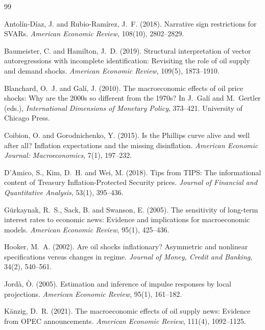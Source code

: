 \documentclass[11pt,a4paper]{article}
\begin{document}
\begin{thebibliography}{99}
\setlength{\itemsep}{0.15em}\small

Antol\'{i}n-D\'{i}az, J. and Rubio-Ram\'{i}rez, J.~F. (2018). Narrative sign restrictions for SVARs. \textit{American Economic Review}, 108(10), 2802--2829.

Baumeister, C. and Hamilton, J.~D. (2019). Structural interpretation of vector autoregressions with incomplete identification: Revisiting the role of oil supply and demand shocks. \textit{American Economic Review}, 109(5), 1873--1910.

Blanchard, O.~J. and Gal\'{i}, J. (2010). The macroeconomic effects of oil price shocks: Why are the 2000s so different from the 1970s? In J.~Gal\'{i} and M.~Gertler (eds.), \textit{International Dimensions of Monetary Policy}, 373--421. University of Chicago Press.

Coibion, O. and Gorodnichenko, Y. (2015). Is the Phillips curve alive and well after all? Inflation expectations and the missing disinflation. \textit{American Economic Journal: Macroeconomics}, 7(1), 197--232.

D'Amico, S., Kim, D.~H. and Wei, M. (2018). Tips from TIPS: The informational content of Treasury Inflation-Protected Security prices. \textit{Journal of Financial and Quantitative Analysis}, 53(1), 395--436.

G\"{u}rkaynak, R.~S., Sack, B. and Swanson, E. (2005). The sensitivity of long-term interest rates to economic news: Evidence and implications for macroeconomic models. \textit{American Economic Review}, 95(1), 425--436.

Hooker, M.~A. (2002). Are oil shocks inflationary? Asymmetric and nonlinear specifications versus changes in regime. \textit{Journal of Money, Credit and Banking}, 34(2), 540--561.

Jord\`{a}, \`{O}. (2005). Estimation and inference of impulse responses by local projections. \textit{American Economic Review}, 95(1), 161--182.

K\"{a}nzig, D.~R. (2021). The macroeconomic effects of oil supply news: Evidence from OPEC announcements. \textit{American Economic Review}, 111(4), 1092--1125.


\end{thebibliography}
\end{document}
